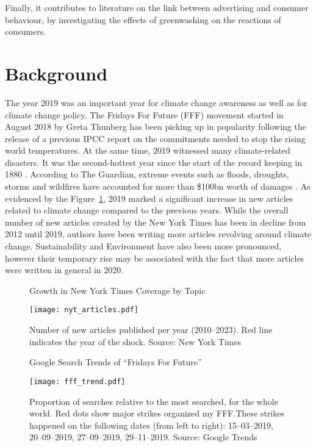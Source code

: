 \documentclass[12pt]{article}
\begin{document}
Finally, it contributes to literature on the link between advertising and consumer behaviour, by investigating the effects of greenwashing on the reactions of consumers. 


\section{Background}\label{sect:background}

The year 2019 was an important year for climate change awareness as well as for climate change policy. The Fridays For Future (FFF) movement started in August 2018 by Greta Thunberg has been picking up in popularity following the release of a previous IPCC report on the commitments needed to stop the rising world temperatures. At the same time, 2019 witnessed many climate-related disasters. It was the second-hottest year since the start of the record keeping in 1880 \parencite{noaa2019global}. According to The Guardian, extreme events such as floods, droughts, storms and wildfires have accounted for more than \$100bn worth of damages \parencite{harvey2019climate}. As evidenced by the Figure~\ref{fig:news_trends}, 2019 marked a significant increase in new articles related to climate change compared to the previous years. While the overall number of new articles created by the New York Times has been in decline from 2012 until 2019, authors have been writing more articles revolving around climate change. Sustainability and Environment have also been more pronounced, however their temporary rise may be associated with the fact that more articles were written in general in 2020.  


\begin{figure}[t]
    \caption{Growth in New York Times Coverage by Topic}\label{fig:news_trends}
    \texttt{[image: nyt\_articles.pdf]}
    \captionsetup{font=footnotesize}
    \caption*{Number of new articles published per year (2010--2023). Red line indicates the year of the shock. Source: New York Times}
\end{figure}

\begin{figure}[t]
    \caption{Google Search Trends of ``Fridays For Future''}\label{fig:fff_trend}
    \texttt{[image: fff\_trend.pdf]}
    \captionsetup{font=footnotesize}
    \caption*{Proportion of searches relative to the most searched, for the whole world. Red dots show major strikes organized my FFF.\@ These strikes happened on the following dates (from left to right): 15--03--2019, 20--09--2019, 27--09--2019, 29--11--2019. Source: Google Trends}
\end{figure}
\end{document}
